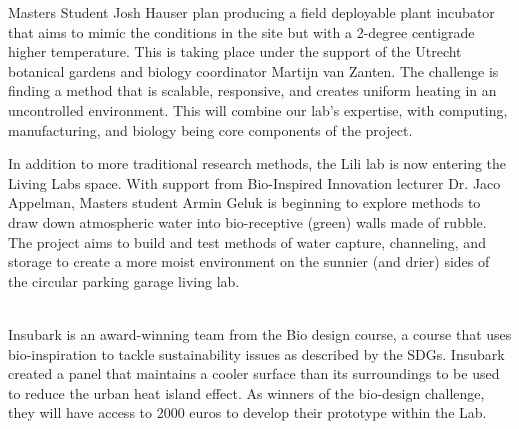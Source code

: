 \documentclass{report}
\begin{document}
Masters Student Josh Hauser plan producing a field deployable plant incubator that aims to mimic the conditions in the site but with a 2-degree centigrade higher temperature. This is taking place under the support of the Utrecht botanical gardens and biology coordinator Martijn van Zanten. The challenge is finding a method that is scalable, responsive, and creates uniform heating in an uncontrolled environment. This will combine our lab's expertise, with computing, manufacturing, and biology being core components of the project. 

In addition to more traditional research methods, the Lili lab is now entering the Living Labs space. With support from Bio-Inspired Innovation lecturer Dr. Jaco Appelman, Masters student Armin Geluk is beginning to explore methods to draw down atmospheric water into bio-receptive (green) walls made of rubble. The project aims to build and test methods of water capture, channeling, and storage to create a more moist environment on the sunnier (and drier) sides of the circular parking garage living lab. 

\clearpage
\begin{figure}
    \centering
\end{figure}
\clearpage

 \\

Insubark is an award-winning team from the Bio design course, a course that uses bio-inspiration to tackle sustainability issues as described by the SDGs. Insubark created a panel that maintains a cooler surface than its surroundings to be used to reduce the urban heat island effect. As winners of the bio-design challenge, they will have access to 2000 euros to develop their prototype within the Lab. 
\end{document}
